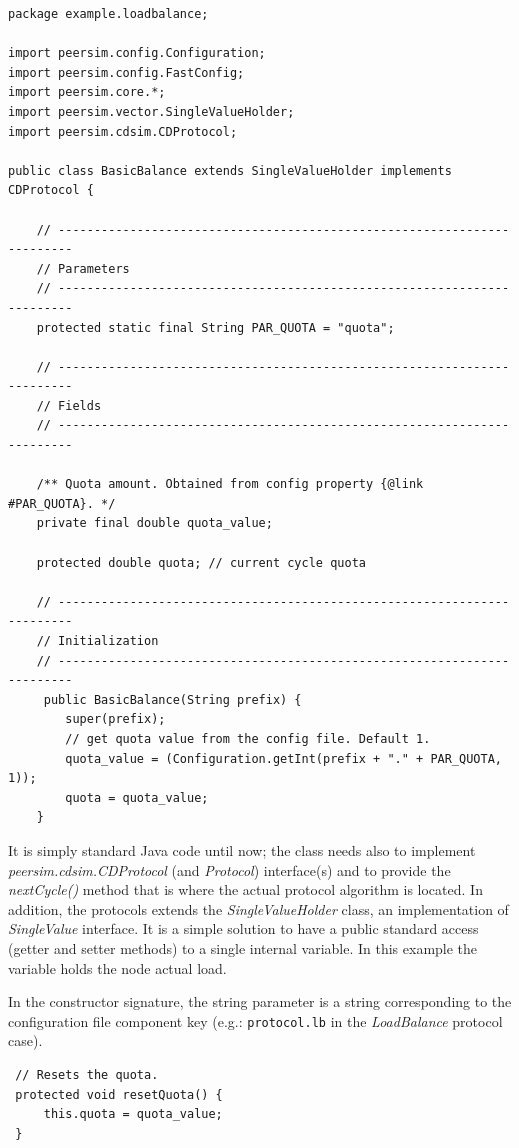 \documentclass[a4paper,11pt]{article}
\begin{document}
\footnotesize
\begin{verbatim}
package example.loadbalance;

import peersim.config.Configuration;
import peersim.config.FastConfig;
import peersim.core.*;
import peersim.vector.SingleValueHolder;
import peersim.cdsim.CDProtocol;

public class BasicBalance extends SingleValueHolder implements CDProtocol {

    // ------------------------------------------------------------------------
    // Parameters
    // ------------------------------------------------------------------------
    protected static final String PAR_QUOTA = "quota";

    // ------------------------------------------------------------------------
    // Fields
    // ------------------------------------------------------------------------

    /** Quota amount. Obtained from config property {@link #PAR_QUOTA}. */
    private final double quota_value;

    protected double quota; // current cycle quota

    // ------------------------------------------------------------------------
    // Initialization
    // ------------------------------------------------------------------------
     public BasicBalance(String prefix) {
        super(prefix);
        // get quota value from the config file. Default 1.
        quota_value = (Configuration.getInt(prefix + "." + PAR_QUOTA, 1));
        quota = quota_value;
    }
\end{verbatim}
\normalsize

It is simply standard Java code until now; the class needs also to
implement \emph{peersim.cdsim.CDProtocol} (and \emph{Protocol})
interface(s) and to provide  the \emph{nextCycle()} method 
that is where the actual protocol algorithm is located.
In addition, the protocols extends the \emph{SingleValueHolder} class,
an implementation of \emph{SingleValue} interface. It is a simple
solution to have a public standard access (getter and setter methods)
to a single internal variable. In this example the variable holds the
node actual load.  

In the constructor signature, the string parameter 
is a string corresponding to the configuration file component key
(e.g.: \texttt{protocol.lb} in the \emph{LoadBalance} protocol case).

\footnotesize
\begin{verbatim}
 // Resets the quota. 
 protected void resetQuota() {
     this.quota = quota_value;
 }
\end{verbatim}
\normalsize
\end{document}
